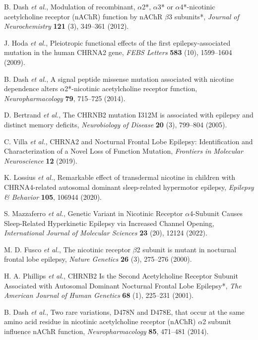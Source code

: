 B. Dash {\em et al.}, Modulation of recombinant, $\alpha$2*, $\alpha$3* or $\alpha$4*-nicotinic acetylcholine receptor (nAChR) function by nAChR $\beta$3 subunits*, {\em Journal of Neurochemistry} {\bf 121} (3), 349--361 (2012).

J. Hoda {\em et al.}, Pleiotropic functional effects of the first epilepsy-associated mutation in the human CHRNA2 gene, {\em FEBS Letters} {\bf 583} (10), 1599--1604 (2009).

B. Dash {\em et al.}, A signal peptide missense mutation associated with nicotine dependence alters $\alpha$2*-nicotinic acetylcholine receptor function, {\em Neuropharmacology} {\bf 79}, 715--725 (2014).

D. Bertrand {\em et al.}, The CHRNB2 mutation I312M is associated with epilepsy and distinct memory deficits, {\em Neurobiology of Disease} {\bf 20} (3), 799--804 (2005).

C. Villa {\em et al.}, CHRNA2 and Nocturnal Frontal Lobe Epilepsy: Identification and Characterization of a Novel Loss of Function Mutation, {\em Frontiers in Molecular Neuroscience} {\bf 12} (2019).

K. Lossius {\em et al.}, Remarkable effect of transdermal nicotine in children with CHRNA4-related autosomal dominant sleep-related hypermotor epilepsy, {\em Epilepsy \& Behavior} {\bf 105}, 106944 (2020).

S. Mazzaferro {\em et al.}, Genetic Variant in Nicotinic Receptor $\alpha$4-Subunit Causes Sleep-Related Hyperkinetic Epilepsy via Increased Channel Opening, {\em International Journal of Molecular Sciences} {\bf 23} (20), 12124 (2022).

M. D. Fusco {\em et al.}, The nicotinic receptor $\beta$2 subunit is mutant in nocturnal frontal lobe epilepsy, {\em Nature Genetics} {\bf 26} (3), 275--276 (2000).

H. A. Phillips {\em et al.}, CHRNB2 Is the Second Acetylcholine Receptor Subunit Associated with Autosomal Dominant Nocturnal Frontal Lobe Epilepsy*, {\em The American Journal of Human Genetics} {\bf 68} (1), 225--231 (2001).

B. Dash {\em et al.}, Two rare variations, D478N and D478E, that occur at the same amino acid residue in nicotinic acetylcholine receptor (nAChR) $\alpha$2 subunit influence nAChR function, {\em Neuropharmacology} {\bf 85}, 471--481 (2014).

